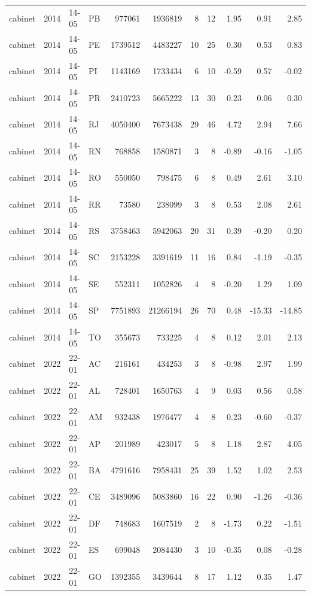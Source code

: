 \begin{landscape}
\begin{longtable}{lllL{1.4cm}rrrrrrr}
cabinet & 2014 & 14-05 & PB & 977061 & 1936819 & 8 & 12 & 1.95 & 0.91 & 2.85 \\
cabinet & 2014 & 14-05 & PE & 1739512 & 4483227 & 10 & 25 & 0.30 & 0.53 & 0.83 \\
cabinet & 2014 & 14-05 & PI & 1143169 & 1733434 & 6 & 10 & -0.59 & 0.57 & -0.02 \\
cabinet & 2014 & 14-05 & PR & 2410723 & 5665222 & 13 & 30 & 0.23 & 0.06 & 0.30 \\
cabinet & 2014 & 14-05 & RJ & 4050400 & 7673438 & 29 & 46 & 4.72 & 2.94 & 7.66 \\
cabinet & 2014 & 14-05 & RN & 768858 & 1580871 & 3 & 8 & -0.89 & -0.16 & -1.05 \\
cabinet & 2014 & 14-05 & RO & 550050 & 798475 & 6 & 8 & 0.49 & 2.61 & 3.10 \\
cabinet & 2014 & 14-05 & RR & 73580 & 238099 & 3 & 8 & 0.53 & 2.08 & 2.61 \\
cabinet & 2014 & 14-05 & RS & 3758463 & 5942063 & 20 & 31 & 0.39 & -0.20 & 0.20 \\
cabinet & 2014 & 14-05 & SC & 2153228 & 3391619 & 11 & 16 & 0.84 & -1.19 & -0.35 \\
cabinet & 2014 & 14-05 & SE & 552311 & 1052826 & 4 & 8 & -0.20 & 1.29 & 1.09 \\
cabinet & 2014 & 14-05 & SP & 7751893 & 21266194 & 26 & 70 & 0.48 & -15.33 & -14.85 \\
cabinet & 2014 & 14-05 & TO & 355673 & 733225 & 4 & 8 & 0.12 & 2.01 & 2.13 \\
cabinet & 2022 & 22-01 & AC & 216161 & 434253 & 3 & 8 & -0.98 & 2.97 & 1.99 \\
cabinet & 2022 & 22-01 & AL & 728401 & 1650763 & 4 & 9 & 0.03 & 0.56 & 0.58 \\
cabinet & 2022 & 22-01 & AM & 932438 & 1976477 & 4 & 8 & 0.23 & -0.60 & -0.37 \\
cabinet & 2022 & 22-01 & AP & 201989 & 423017 & 5 & 8 & 1.18 & 2.87 & 4.05 \\
cabinet & 2022 & 22-01 & BA & 4791616 & 7958431 & 25 & 39 & 1.52 & 1.02 & 2.53 \\
cabinet & 2022 & 22-01 & CE & 3489096 & 5083860 & 16 & 22 & 0.90 & -1.26 & -0.36 \\
cabinet & 2022 & 22-01 & DF & 748683 & 1607519 & 2 & 8 & -1.73 & 0.22 & -1.51 \\
cabinet & 2022 & 22-01 & ES & 699048 & 2084430 & 3 & 10 & -0.35 & 0.08 & -0.28 \\
cabinet & 2022 & 22-01 & GO & 1392355 & 3439644 & 8 & 17 & 1.12 & 0.35 & 1.47 \\

\end{longtable}
\end{landscape}
